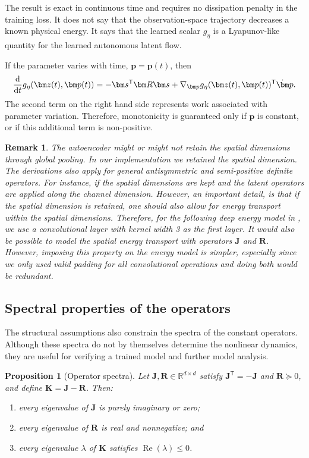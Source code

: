 \documentclass[a4paper,11pt]{article}
\newtheorem{proposition}{Proposition}
\newtheorem{remark}{Remark}
\newcommand{\R}{\mathbb{R}}
\newcommand{\z}{\bm z}
\newcommand{\p}{\bm p}
\newcommand{\s}{\bm s}
\newcommand{\Jop}{\bm J}
\newcommand{\Rop}{\bm R}
\newcommand{\Kop}{\bm K}
\newcommand{\Genergy}{g_{\eta}}
\begin{document}
The result is exact in continuous time and requires no dissipation penalty in
the training loss. It does not say that the observation-space trajectory
decreases a known physical energy. It says that the learned scalar
$g_\eta$ is a Lyapunov-like quantity for the learned autonomous latent flow.

If the parameter varies with time, $\p=\p(t)$, then
\begin{equation}
 \frac{\mathrm d}{\mathrm dt}\Genergy(\z(t),\p(t))=-\s^{\mathsf T}\Rop\s+\nabla_{\p}\Genergy(\z(t),\p(t))^{\mathsf T}\dot\p.
 \label{eq:nonautonomous-energy}
\end{equation}
The second term on the right hand side represents work associated with parameter variation. Therefore, monotonicity is guaranteed only if $\p$ is constant, or if this additional term is non-positive.

\begin{remark}
The autoencoder might or might not retain the spatial dimensions through global pooling. In our implementation we retained the spatial dimension. The  derivations also apply for general antisymmetric and semi-positive definite operators. For instance, if the spatial dimensions are kept and the latent operators are applied along the channel dimension. However, an important detail, is that if the spatial dimension is retained, one should also allow for energy transport within the spatial dimensions. Therefore, for the following deep energy model in , we use a convolutional layer with kernel width 3 as the first layer. It would also be possible to model the spatial energy transport with operators $\Jop$ and $\Rop$. However, imposing this property on the energy model is simpler, especially since we only used valid padding for all convolutional operations and doing both would be redundant.
\end{remark}

\subsection{Spectral properties of the operators}
The structural assumptions also constrain the spectra of the constant
operators. Although these spectra do not by themselves determine the nonlinear
dynamics, they are useful for verifying a trained model and further model analysis.

\begin{proposition}[Operator spectra]
Let $\Jop,\Rop\in\R^{d\times d}$ satisfy
$\Jop^{\mathsf T}=-\Jop$ and $\Rop\succeq0$, and define
$\Kop=\Jop-\Rop$. Then:
\begin{enumerate}[label=(\roman*)]
  \item every eigenvalue of $\Jop$ is purely imaginary or zero;
  \item every eigenvalue of $\Rop$ is real and nonnegative; and
  \item every eigenvalue $\lambda$ of $\Kop$ satisfies
        $\operatorname{Re}(\lambda)\leq0$.
\end{enumerate}
\label{prop:operator_spectra}
\end{proposition}
\end{document}
